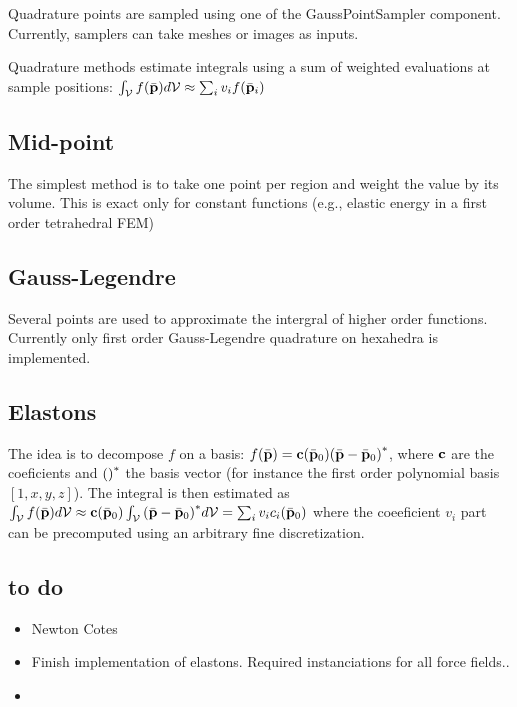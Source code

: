 Quadrature points are sampled using one of the GaussPointSampler component.
Currently, samplers can take meshes or images as inputs.

Quadrature methods estimate integrals using a sum of weighted evaluations at sample positions: $\int_{\mathcal{V}} f(\bar{\mathbf{{p}}}) d\mathcal{V} \approx \sum_i v_i f(\bar{\mathbf{{p}}}_i) $

\subsection{Mid-point}

The simplest method is to take one point per region and weight the value by its volume.
This is exact only for constant functions (e.g., elastic energy in a first order tetrahedral FEM)

\subsection{Gauss-Legendre}

Several points are used to approximate the intergral of higher order functions.
Currently only first order Gauss-Legendre quadrature on hexahedra is implemented.

\subsection{Elastons}

The idea is to decompose $f$ on a basis: $f(\bar{\mathbf{{p}}})=\mathbf{{c}}(\bar{\mathbf{{p}}}_0) {(\bar{\mathbf{{p}}}-\bar{\mathbf{{p}}}_0)}^{*}$, 
where $\mathbf{{c}}$ are the coeficients and ${()}^{*}$ the basis vector (for instance the first order polynomial basis $[1,x,y,z]$).
The integral is then estimated as  $\int_{\mathcal{V}} f(\bar{\mathbf{{p}}}) d\mathcal{V} \approx \mathbf{{c}}(\bar{\mathbf{{p}}}_0)  \int_{\mathcal{V}} {(\bar{\mathbf{{p}}}-\bar{\mathbf{{p}}}_0)}^{*} d\mathcal{V} = \sum_i v_i c_i(\bar{\mathbf{{p}}}_0) $
where the coeeficient $v_i$ part can be precomputed using an arbitrary fine discretization.

\subsection{to do}

\begin{itemize}
 \item Newton Cotes
 \item Finish implementation of elastons. Required instanciations for all force fields..
 \item 
\end{itemize}
